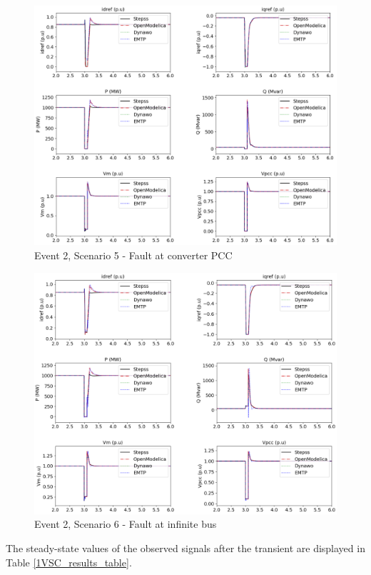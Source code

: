 \documentclass{report}
\begin{document}
\begin{figure}[H]
    \centering
    \includegraphics[scale = 0.61]{Simulation_results/Event2Scenario5.png}
    \caption{Event 2, Scenario 5 - Fault at converter PCC}
    \label{fig:Event2Scenario5}
\end{figure}
\begin{figure}[H]
    \centering
    \includegraphics[scale = 0.61]{Simulation_results/Event2Scenario6.png}
    \caption{Event 2, Scenario 6 - Fault at infinite bus }
    \label{fig:Event2Scenario6}
\end{figure}
The steady-state values of the observed signals after the transient are displayed in Table \ref{1VSC_results_table}.
\end{document}
